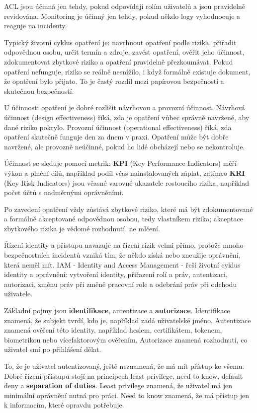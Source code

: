 \documentclass[11pt,a4paper]{article}
\begin{document}
ACL jsou účinná jen tehdy, pokud odpovídají rolím uživatelů a jsou pravidelně revidována. Monitoring je účinný jen tehdy, pokud někdo logy vyhodnocuje a reaguje na incidenty.

Typický životní cyklus opatření je: navrhnout opatření podle rizika, přiřadit odpovědnou osobu, určit termín a zdroje, zavést opatření, ověřit jeho účinnost, zdokumentovat zbytkové riziko a opatření pravidelně přezkoumávat. Pokud opatření nefunguje, riziko se reálně nesnížilo, i když formálně existuje dokument, že opatření bylo přijato. To je častý rozdíl mezi papírovou bezpečností a skutečnou bezpečností.

U účinnosti opatření je dobré rozlišit návrhovou a provozní účinnost. Návrhová účinnost (design effectiveness) říká, zda je opatření vůbec správně navržené, aby dané riziko pokrylo. Provozní účinnost (operational effectiveness) říká, zda opatření skutečně funguje den za dnem v praxi. Opatření může být dobře navržené, ale provozně neúčinné, pokud ho lidé obcházejí nebo se nekontroluje.

Účinnost se sleduje pomocí metrik: \textbf{KPI} (Key Performance Indicators) měří výkon a plnění cílů, například podíl včas nainstalovaných záplat, zatímco \textbf{KRI} (Key Risk Indicators) jsou včasné varovné ukazatele rostoucího rizika, například počet účtů s nadměrnými oprávněními.

Po zavedení opatření vždy zůstává zbytkové riziko, které má být zdokumentované a formálně akceptované odpovědnou osobou, tedy vlastníkem rizika; akceptace zbytkového rizika je vědomé rozhodnutí, ne mlčení.

Řízení identity a přístupu navazuje na řízení rizik velmi přímo, protože mnoho bezpečnostních incidentů vzniká tím, že někdo získá nebo zneužije oprávnění, která neměl mít. IAM - Identity and Access Management - řeší životní cyklus identity a oprávnění: vytvoření identity, přiřazení rolí a práv, autentizaci, autorizaci, změnu práv při změně pracovní role a odebrání práv při odchodu uživatele.

Základní pojmy jsou \textbf{identifikace}, autentizace a \textbf{autorizace}. Identifikace znamená, že subjekt tvrdí, kdo je, například zadá uživatelské jméno. Autentizace znamená ověření této identity, například heslem, certifikátem, tokenem, biometrikou nebo vícefaktorovým ověřením. Autorizace znamená rozhodnutí, co uživatel smí po přihlášení dělat.

To, že je uživatel autentizovaný, ještě neznamená, že má mít přístup ke všemu. Dobré řízení přístupu stojí na principech least privilege, need to know, default deny a \textbf{separation of duties}. Least privilege znamená, že uživatel má jen minimální oprávnění nutná pro práci. Need to know znamená, že má přístup jen k informacím, které opravdu potřebuje.
\end{document}
